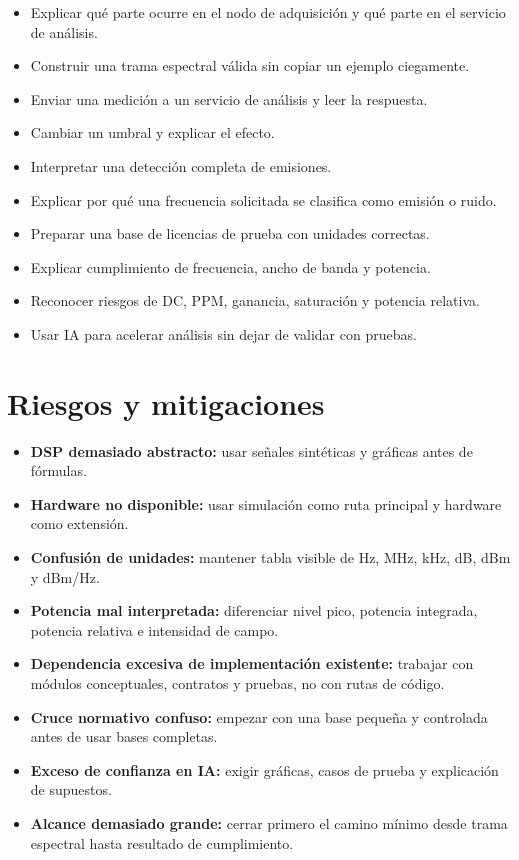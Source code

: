 \documentclass[11pt,a4paper]{article}
\begin{document}
\begin{itemize}
  \item Explicar qué parte ocurre en el nodo de adquisición y qué parte en el servicio de análisis.
  \item Construir una trama espectral válida sin copiar un ejemplo ciegamente.
  \item Enviar una medición a un servicio de análisis y leer la respuesta.
  \item Cambiar un umbral y explicar el efecto.
  \item Interpretar una detección completa de emisiones.
  \item Explicar por qué una frecuencia solicitada se clasifica como emisión o ruido.
  \item Preparar una base de licencias de prueba con unidades correctas.
  \item Explicar cumplimiento de frecuencia, ancho de banda y potencia.
  \item Reconocer riesgos de DC, PPM, ganancia, saturación y potencia relativa.
  \item Usar IA para acelerar análisis sin dejar de validar con pruebas.
\end{itemize}

\section*{Riesgos y mitigaciones}

\begin{itemize}
  \item \textbf{DSP demasiado abstracto:} usar señales sintéticas y gráficas antes de fórmulas.
  \item \textbf{Hardware no disponible:} usar simulación como ruta principal y hardware como extensión.
  \item \textbf{Confusión de unidades:} mantener tabla visible de Hz, MHz, kHz, dB, dBm y dBm/Hz.
  \item \textbf{Potencia mal interpretada:} diferenciar nivel pico, potencia integrada, potencia relativa e intensidad de campo.
  \item \textbf{Dependencia excesiva de implementación existente:} trabajar con módulos conceptuales, contratos y pruebas, no con rutas de código.
  \item \textbf{Cruce normativo confuso:} empezar con una base pequeña y controlada antes de usar bases completas.
  \item \textbf{Exceso de confianza en IA:} exigir gráficas, casos de prueba y explicación de supuestos.
  \item \textbf{Alcance demasiado grande:} cerrar primero el camino mínimo desde trama espectral hasta resultado de cumplimiento.
\end{itemize}
\end{document}
